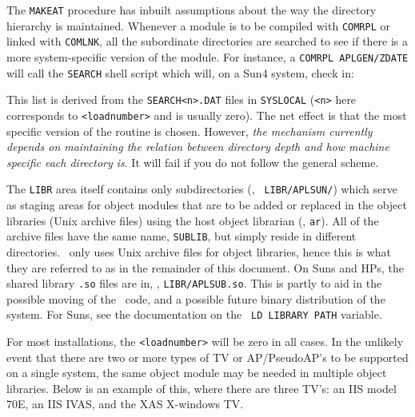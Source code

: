 The {\tt MAKEAT} procedure has inbuilt assumptions about the way the
directory hierarchy is maintained.  Whenever a module is to be
compiled with {\tt COMRPL} or linked with {\tt COMLNK}, all the
subordinate directories are searched to see if there is a more
system-specific version of the module.  For instance, a {\tt COMRPL
\dol APLGEN/ZDATE} will call the {\tt SEARCH} shell script which will, on
a Sun4 system, check in:\medskip

\medskip

\noindent This list is derived from the {\tt SEARCH<n>.DAT} files in
{\tt\dol SYSLOCAL} ({\tt <n>} here corresponds to {\tt <loadnumber>} and is
usually zero).  The net effect is that the most specific version of the
routine is chosen.  However, {\it the mechanism currently depends on
maintaining the relation between directory depth and how machine
specific each directory is\/}.  It will fail if you do not follow the
general scheme.

The {\tt \dol LIBR} area itself contains only subdirectories (\eg, {\tt
\dol LIBR/APLSUN/}) which serve as staging areas for object modules that
are to be added or replaced in the object libraries (Unix archive files)
using the host object librarian (\eg, {\tt ar}).  All of the archive
files have the same name, {\tt SUBLIB}, but simply reside in different
directories.  \AIPS\ only uses Unix archive files for object libraries,
hence this is what they are referred to as in the remainder of this
document.  On Suns and HPs, the shared library {\tt *.so} files
are in, \eg, {\tt \dol LIBR/APLSUB.so}.  This is partly to aid in the
possible moving of the \AIPS\ code, and a possible future binary
distribution of the system.  For Suns, see the documentation on the {\tt
LD LIBRARY PATH} variable.

For most installations, the {\tt <loadnumber>} will be zero in all
cases.  In the unlikely event that there are two or more types of TV or
AP/PseudoAP's to be supported on a single system, the same object module
may be needed in multiple object libraries.  Below is an example of
this, where there are three TV's: an IIS model 70E, an IIS IVAS, and the
XAS X-windows TV.  \medskip

\example{ }
\example{ }
\example{ }
\example{ }
\example{ }
\example{ }
\example{ }
\example{ }
\example{ }
\example{ }
\example{ }\medskip

